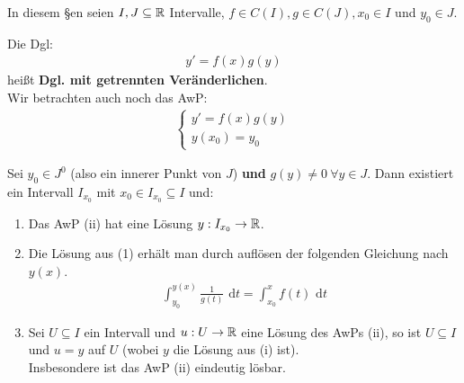\documentclass[a4paper,twoside,DIV15,BCOR12mm,chapterprefix=true,headings=twolinechapter]{scrbook}
\begin{document}
In diesem §en seien $I,J\subseteq\mathbb{R}$ Intervalle, $f\in C(I),g\in C(J),x_0\in I$ und
$y_0\in J$.

\begin{definition}
Die Dgl:
\begin{align*}
y'=f(x)g(y)\tag{i}
\end{align*}
heißt \textbf{Dgl. mit getrennten Veränderlichen}.\\
Wir betrachten auch noch das AwP:
\begin{align*}
\begin{cases}
y'=f(x)g(y)\\
y(x_0)=y_0
\end{cases}
\tag{ii}
\end{align*}
\end{definition}

\begin{satz}
Sei $y_0\in J^0$ (also ein innerer Punkt von $J$) \textbf{und} $g(y)\ne 0\ \forall y\in J$.
Dann existiert ein Intervall $I_{x_0}$ mit $x_0\in I_{x_0}\subseteq I$ und:
\begin{enumerate}
\item Das AwP (ii) hat eine Lösung $y:I_{x_0}\to\mathbb{R}$.
\item Die Lösung aus (1) erhält man durch auflösen der folgenden Gleichung nach $y(x)$.
\begin{align*}
\int_{y_0}^{y(x)}\frac 1{g(t)}\text{ d}t=\int_{x_0}^x f(t)\text{ d}t\tag{$*$}
\end{align*}
\item Sei $U\subseteq I$ ein Intervall und $u:U\to\mathbb{R}$ eine Lösung des AwPs (ii),
so ist $U\subseteq I$ und $u=y$ auf $U$ (wobei $y$ die Lösung aus (i) ist).\\
Insbesondere ist das AwP (ii) eindeutig lösbar.
\end{enumerate}
\end{satz}
\end{document}
